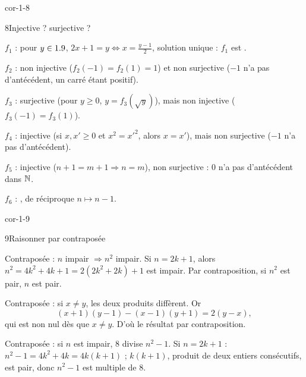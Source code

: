 \begin{blocLivre}{cor-1-8}
\begin{corrige}{8}{Injective ? surjective ?}
\begin{questions}
  \item $f_1$ : pour $y\in1.9$, $2x+1=y\iff x=\frac{y-1}{2}$, solution unique : $f_1$ est .
  \item $f_2$ : non injective ($f_2(-1)=f_2(1)=1$) et non surjective ($-1$ n'a pas d'antécédent, un carré étant positif).
  \item $f_3$ : surjective (pour $y\geq0$, $y=f_3(\sqrt{y})$), mais non injective ($f_3(-1)=f_3(1)$).
  \item $f_4$ : injective (si $x,x'\geq0$ et $x^{2}=x'^{2}$, alors $x=x'$), mais non surjective ($-1$ n'a pas d'antécédent).
  \item $f_5$ : injective ($n+1=m+1\Rightarrow n=m$), non surjective : $0$ n'a pas d'antécédent dans $\mathbb{N}$.
  \item $f_6$ : , de réciproque $n\mapsto n-1$.
\end{questions}
\end{corrige}
\end{blocLivre}

\begin{blocLivre}{cor-1-9}
\begin{corrige}{9}{Raisonner par contraposée}
\begin{questions}
  \item Contraposée : $n$ impair $\Rightarrow n^{2}$ impair. Si $n=2k+1$, alors
    $n^{2}=4k^{2}+4k+1=2(2k^{2}+2k)+1$ est impair. Par contraposition, si $n^{2}$ est pair, $n$ est pair.
  \item Contraposée : si $x\neq y$, les deux produits diffèrent. Or
    \[(x+1)(y-1)-(x-1)(y+1)=2(y-x),\]
    qui est non nul dès que $x\neq y$. D'où le résultat par contraposition.
  \item Contraposée : si $n$ est impair, $8$ divise $n^{2}-1$. Si $n=2k+1$ :
    $n^{2}-1=4k^{2}+4k=4k(k+1)$ ; $k(k+1)$, produit de deux entiers consécutifs, est pair,
    donc $n^{2}-1$ est multiple de $8$.
\end{questions}
\end{corrige}
\end{blocLivre}

